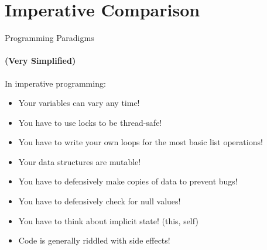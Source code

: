 \documentclass[mathserif]{beamer}
\begin{document}
\section{Imperative Comparison}

\begin{frame}{Programming Paradigms}
  \framesubtitle{(Very Simplified)}
\end{frame}

\begin{frame}

  In imperative programming:

  \begin{itemize}[<+->]
  \item Your variables can vary any time!
  \item You have to use locks to be thread-safe!
  \item You have to write your own loops for the most basic list operations!
  \item Your data structures are mutable!
  \item You have to defensively make copies of data to prevent bugs!
  \item You have to defensively check for null values!
  \item You have to think about implicit state! (this, self)
  \item Code is generally riddled with side effects!
  \end{itemize}
\end{frame}
\end{document}
